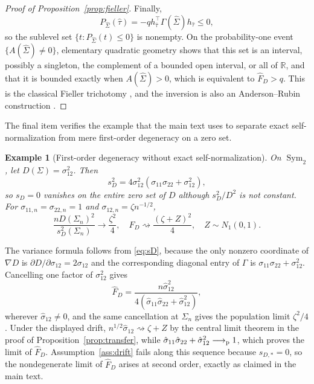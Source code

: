 \documentclass[12pt,a4paper]{article}
\theoremstyle{plain}
\newtheorem{example}{Example}
\theoremstyle{definition}
\newcommand{\R}{\mathbb{R}}
\newcommand{\Sym}{\operatorname{Sym}}
\newcommand{\pto}{\longrightarrow_{\rm p}}
\newcommand{\dto}{\rightsquigarrow}
\newcommand{\Sighat}{\hat{\Sigma}}
\newcommand{\FD}{\widehat{F}_D}
\begin{document}
\begin{proof}[Proof of Proposition~\ref{prop:fieller}]
    Finally,
    \begin{equation*}
        P_{\Sighat}(\hat{\tau})
        =
        -qh_{\hat{\tau}}^\top
        \Gamma(\Sighat)h_{\hat{\tau}}\le0
        ,
    \end{equation*}
    so the sublevel set $\{t:P_{\Sighat}(t)\le0\}$ is nonempty.
    On the probability-one event $\{A(\Sighat)\neq0\}$, elementary quadratic geometry shows that this set is an interval, possibly a singleton, the complement of a bounded open interval, or all of $\R$, and that it is bounded exactly when $A(\Sighat)>0$, which is equivalent to $\FD>q$.
    This is the classical Fieller trichotomy \citep{fieller1954}, and the inversion is also an Anderson--Rubin construction \citep{andersonrubin1949}.
\end{proof}

The final item verifies the example that the main text uses to separate exact self-normalization from mere first-order degeneracy on a zero set.

\begin{example}[First-order degeneracy without exact self-normalization]
\label{ex:squared-covariance}
    On $\Sym_2$, let $D(\Sigma)=\sigma_{12}^2$.
    Then
    \begin{equation*}
        s_D^2
        =
        4\sigma_{12}^2(\sigma_{11}\sigma_{22}+\sigma_{12}^2)
        ,
    \end{equation*}
    so $s_D=0$ vanishes on the entire zero set of $D$ although $s_D^2/D^2$ is not constant.
    For $\sigma_{11,n}=\sigma_{22,n}=1$ and $\sigma_{12,n}=\zeta n^{-1/2}$,
    \begin{equation*}
         \frac{nD(\Sigma_n)^2}{s_D^2(\Sigma_n)}\to\frac{\zeta^2}{4}
         ,\quad
         \FD\dto\frac{(\zeta+Z)^2}{4}
         ,\quad
         Z\sim N_1(0,1)
         .
    \end{equation*}
\end{example}

The variance formula follows from \eqref{eq:sD}, because the only nonzero coordinate of $\nabla D$ is $\partial D/\partial\sigma_{12}=2\sigma_{12}$ and the corresponding diagonal entry of $\Gamma$ is $\sigma_{11}\sigma_{22}+\sigma_{12}^2$.
Cancelling one factor of $\sigma_{12}^2$ gives
\begin{equation*}
    \FD
    =
    \frac{n\hat{\sigma}_{12}^2}
    {4(\hat{\sigma}_{11}\hat{\sigma}_{22}+\hat{\sigma}_{12}^2)}
    ,
\end{equation*}
wherever $\hat{\sigma}_{12}\ne0$, and the same cancellation at $\Sigma_n$ gives the population limit $\zeta^2/4$.
Under the displayed drift, $n^{1/2}\hat{\sigma}_{12}\dto\zeta+Z$ by the central limit theorem in the proof of Proposition~\ref{prop:transfer}, while $\hat{\sigma}_{11}\hat{\sigma}_{22}+\hat{\sigma}_{12}^2\pto1$, which proves the limit of $\FD$.
Assumption~\ref{ass:drift} fails along this sequence because $s_{D,\ast}=0$, so the nondegenerate limit of $\FD$ arises at second order, exactly as claimed in the main text.
\end{document}
